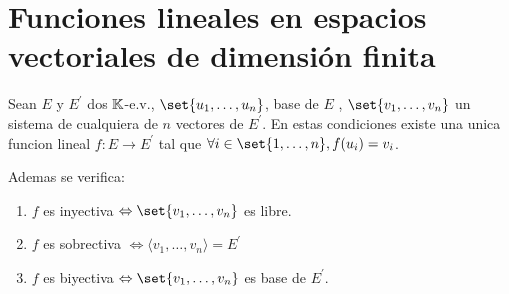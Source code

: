 \section{Funciones lineales en espacios vectoriales de dimensión finita}
\begin{theorem}
	Sean \(E \) y \(E^\prime  \) dos \(\mathbb{K} \)-e.v., \(\set{u_1,\ldots,u_n}\), base de \(E\) , \(\set{v_1, \ldots, v_n }\) un sistema de cualquiera de \(n \) vectores de \(E^\prime  \). En estas condiciones existe una unica funcion lineal \(f \colon E \to E^\prime  \) tal que \(\forall i \in \set{1,\ldots,n }, f(u_i) = v_i \).

	Ademas se verifica:
	\begin{enumerate}
		\item \(f \) es inyectiva \(\iff \set{v_1,\ldots,v_n }\) es libre.
		\item \(f \) es sobrectiva \(\iff \langle v_1,\ldots,v_n \rangle = E^\prime \)
		\item \(f \) es biyectiva \(\iff \set{v_1,\ldots,v_n }\) es base de \(E^\prime  \).
	\end{enumerate}
\end{theorem}
